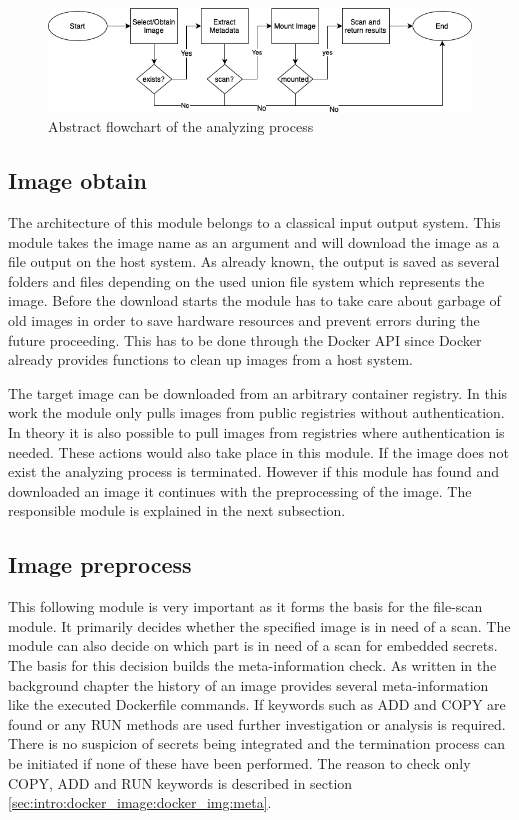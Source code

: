 \begin{figure}[htbp]
\centering
\includegraphics[width=1.0\textwidth]{gfx/examples/basic_workflow_scan}
\caption{Abstract flowchart of the analyzing process}
\label{ch:theory:analyzing process:fig}
\end{figure}

\subsection{Image obtain}
\label{ch:theory:analyzing_process:obtain}
The architecture of this module belongs to a classical input output system. This module takes the image name as an argument and will download the image as a file output on the host system. 
As already known, the output is saved as several folders and files depending on the used union file system which represents the image. 
Before the download starts the module has to take care about garbage of old images in order to save hardware resources and prevent errors during the future proceeding. 
This has to be done through the Docker API since Docker already provides functions to clean up images from a host system.

The target image can be downloaded from an arbitrary container registry.
In this work the module only pulls images from public registries without authentication. 
In theory it is also possible to pull images from registries where authentication is needed. 
These actions would also take place in this module.
If the image does not exist the analyzing process is terminated.
However if this module has found and downloaded an image it continues with the preprocessing of the image. 
The responsible module is explained in the next subsection.

\subsection{Image preprocess}
\label{ch:theory:analyzing_process:prepro}
This following module is very important as it forms the basis for the file-scan module. 
It primarily decides whether the specified image is in need of a scan.
The module can also decide on which part is in need of a scan for embedded secrets. 
The basis for this decision builds the meta-information check. 
As written in the background chapter the history of an image provides several meta-information like the executed Dockerfile commands.
If keywords such as ADD and COPY are found or any RUN methods are used further investigation or analysis is required.
There is no suspicion of secrets being integrated and the termination process can be initiated if none of these have been performed.
The reason to check only COPY, ADD and RUN keywords is described in section \ref{sec:intro:docker_image:docker_img:meta}. 

